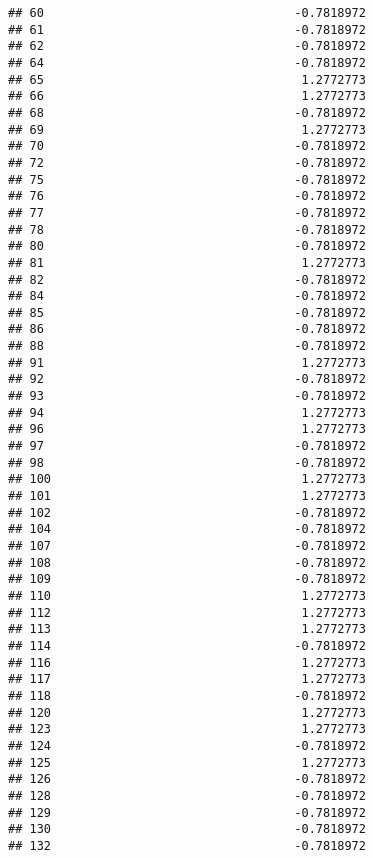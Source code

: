 \documentclass[
]{article}
\begin{document}
\begin{verbatim}
## 60                                   -0.7818972
## 61                                   -0.7818972
## 62                                   -0.7818972
## 64                                   -0.7818972
## 65                                    1.2772773
## 66                                    1.2772773
## 68                                   -0.7818972
## 69                                    1.2772773
## 70                                   -0.7818972
## 72                                   -0.7818972
## 75                                   -0.7818972
## 76                                   -0.7818972
## 77                                   -0.7818972
## 78                                   -0.7818972
## 80                                   -0.7818972
## 81                                    1.2772773
## 82                                   -0.7818972
## 84                                   -0.7818972
## 85                                   -0.7818972
## 86                                   -0.7818972
## 88                                   -0.7818972
## 91                                    1.2772773
## 92                                   -0.7818972
## 93                                   -0.7818972
## 94                                    1.2772773
## 96                                    1.2772773
## 97                                   -0.7818972
## 98                                   -0.7818972
## 100                                   1.2772773
## 101                                   1.2772773
## 102                                  -0.7818972
## 104                                  -0.7818972
## 107                                  -0.7818972
## 108                                  -0.7818972
## 109                                  -0.7818972
## 110                                   1.2772773
## 112                                   1.2772773
## 113                                   1.2772773
## 114                                  -0.7818972
## 116                                   1.2772773
## 117                                   1.2772773
## 118                                  -0.7818972
## 120                                   1.2772773
## 123                                   1.2772773
## 124                                  -0.7818972
## 125                                   1.2772773
## 126                                  -0.7818972
## 128                                  -0.7818972
## 129                                  -0.7818972
## 130                                  -0.7818972
## 132                                  -0.7818972

\end{verbatim}
\end{document}
